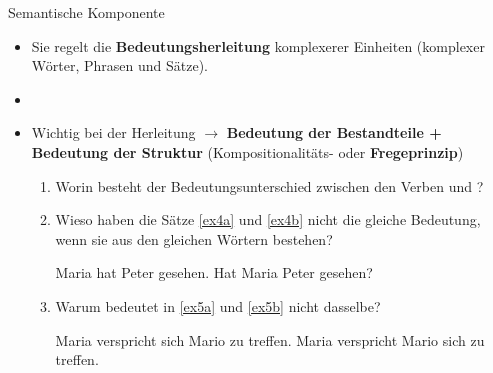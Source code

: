 \begin{frame}{Semantische Komponente}
	
	\begin{itemize}
		\item Sie regelt die \textbf{Bedeutungsherleitung} komplexerer Einheiten (komplexer Wörter, Phrasen und Sätze).
		\item[]
		\item<2-> Wichtig bei der Herleitung $\rightarrow$ \textbf{Bedeutung der Bestandteile + Bedeutung der Struktur} (Kompositionalitäts- oder \textbf{Fregeprinzip})
				
		\begin{enumerate}
			\item<3->[$\rightarrow$] Worin besteht der Bedeutungsunterschied zwischen den Verben  und ?
			\item<4->[$\rightarrow$] Wieso haben die Sätze \ref{ex4a} und \ref{ex4b} nicht die gleiche Bedeutung, wenn sie aus den gleichen Wörtern bestehen?

\eal	
	\ex Maria hat Peter gesehen. \label{ex4a}
	\ex Hat Maria Peter gesehen? \label{ex4b}
\zl

			\item<5->[$\rightarrow$] Warum bedeutet  in \ref{ex5a} und \ref{ex5b} nicht dasselbe?
	
\eal
	\ex Maria verspricht sich Mario zu treffen. \label{ex5a}
	\ex Maria verspricht Mario sich zu treffen. \label{ex5b}
\zl

		\end{enumerate}
		
	\end{itemize}
	
\end{frame}


%
%
		
